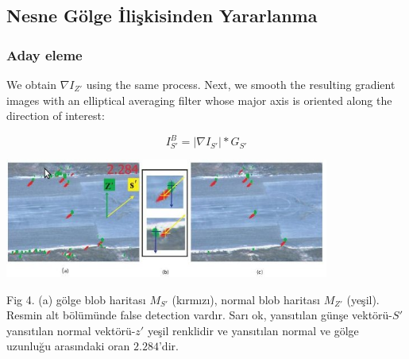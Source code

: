 \documentclass{beamer}
\begin{document}
\subsection{Nesne Gölge İlişkisinden Yararlanma}

\begin{frame}[allowframebreaks]
	\frametitle{Aday eleme}

	We obtain $\nabla I_{Z'}$ using the same process. Next, we smooth the
	resulting gradient images with an elliptical averaging filter whose major
	axis is oriented along the direction of interest:

	\begin{equation}
		I_{S'}^B = |\nabla I_{S'}| * G_{S'}
		\label{eq:smooth-images}
	\end{equation}




	\includegraphics[width=0.8\textwidth]{img/fig4.jpg}\label{fig:aday-eleme}

	\begin{scriptsize}
	Fig 4. (a) gölge blob haritası $M_{S'}$ (kırmızı), normal blob haritası
	$M_{Z'}$ (yeşil). Resmin alt bölümünde false detection vardır. Sarı ok,
	yansıtılan günşe vektörü-$S'$ yansıtılan normal vektörü-$z'$ yeşil
	renklidir ve yansıtılan normal ve gölge uzunluğu arasındaki oran
	$2.284$'dir.


\end{scriptsize}
\end{frame}
\end{document}
